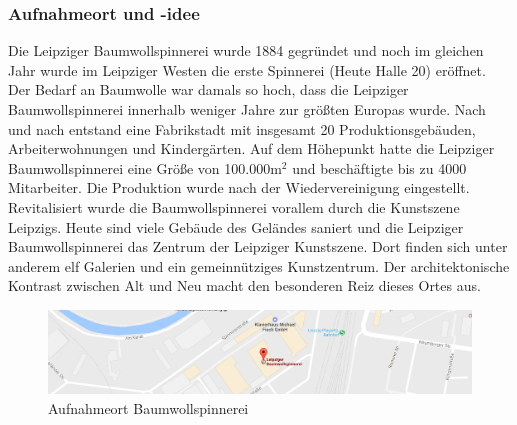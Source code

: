 \documentclass[liststotoc,bibtotoc,fontsize=14pt,]{scrreprt}
\begin{document}
	\subsubsection{Aufnahmeort und -idee}
	Die Leipziger Baumwollspinnerei wurde 1884 gegründet und noch im gleichen Jahr wurde im Leipziger Westen die erste Spinnerei (Heute Halle 20) eröffnet. Der Bedarf an Baumwolle war damals so hoch, dass die Leipziger Baumwollspinnerei innerhalb weniger Jahre zur größten Europas wurde. Nach und nach entstand eine Fabrikstadt mit insgesamt 20 Produktionsgebäuden, Arbeiterwohnungen und Kindergärten. Auf dem Höhepunkt hatte die Leipziger Baumwollspinnerei eine Größe von 100.000m$^2$ und beschäftigte bis zu 4000 Mitarbeiter. Die Produktion wurde nach der Wiedervereinigung eingestellt. Revitalisiert wurde die Baumwollspinnerei vorallem durch die Kunstszene Leipzigs. Heute sind viele Gebäude des Geländes saniert und die Leipziger Baumwollspinnerei das Zentrum der Leipziger Kunstszene. Dort finden sich unter anderem elf Galerien und ein gemeinnütziges Kunstzentrum. Der architektonische Kontrast zwischen Alt und Neu macht den besonderen Reiz dieses Ortes aus.
		\begin{figure}[H]
			\includegraphics[width=\linewidth]{img/places/spinnerei_map.jpg}
			\caption{Aufnahmeort Baumwollspinnerei}
			\label{img:ak_map}
		\end{figure}
\end{document}
